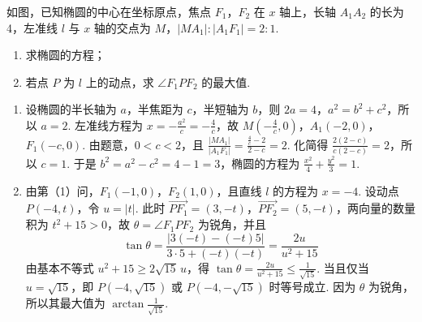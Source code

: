 \begin{problem}
如图，已知椭圆的中心在坐标原点，焦点 \(F_{1}\)，\(F_{2}\) 在 \(x\) 轴上，长轴 \(A_{1}A_{2}\) 的长为 4，左准线 \(l\) 与 \(x\) 轴的交点为 \(M\)，\(|MA_{1}|: |A_{1}F_{1}| = 2: 1\).
\begin{enumerate}
\item 求椭圆的方程；
\item 若点 \(P\) 为 \(l\) 上的动点，求 \(\angle F_1PF_2\) 的最大值.
\end{enumerate}


\begin{solution}
\begin{enumerate}
\item 设椭圆的半长轴为 \(a\)，半焦距为 \(c\)，半短轴为 \(b\)，则 \(2a=4\)，\(a^2=b^2+c^2\)，所以 \(a=2\). 左准线方程为 \(x=-\frac{a^2}{c}=-\frac{4}{c}\)，故 \(M\left(-\frac{4}{c},0\right)\)，\(A_{1}(-2,0)\)，\(F_{1}(-c,0)\). 由题意，\(0<c<2\)，且 \(\frac{|MA_{1}|}{|A_{1}F_{1}|}=\frac{\frac{4}{c}-2}{2-c}=2\). 化简得 \(\frac{2(2-c)}{c(2-c)}=2\)，所以 \(c=1\). 于是 \(b^2=a^2-c^2=4-1=3\)，椭圆的方程为 \(\frac{x^2}{4}+\frac{y^2}{3}=1\).

\item 由第（1）问，\(F_{1}(-1,0)\)，\(F_{2}(1,0)\)，且直线 \(l\) 的方程为 \(x=-4\). 设动点 \(P\left(-4,t\right)\)，令 \(u=|t|\). 此时 \(\overrightarrow{PF_{1}}=(3,-t)\)，\(\overrightarrow{PF_{2}}=(5,-t)\)，两向量的数量积为 \(t^2+15>0\)，故 \(\theta=\angle F_{1}PF_{2}\) 为锐角，并且
\[
\tan\theta=\frac{\left|3(-t)-(-t)5\right|}{3\cdot5+(-t)(-t)}=\frac{2u}{u^2+15}
\]
由基本不等式 \(u^2+15\geqslant2\sqrt{15}\,u\)，得 \(\tan\theta=\frac{2u}{u^2+15}\leqslant\frac{1}{\sqrt{15}}\). 当且仅当 \(u=\sqrt{15}\)，即 \(P\left(-4,\sqrt{15}\right)\) 或 \(P\left(-4,-\sqrt{15}\right)\) 时等号成立. 因为 \(\theta\) 为锐角，所以其最大值为 \(\arctan\frac{1}{\sqrt{15}}\).
\end{enumerate}
\end{solution}
\end{problem}

